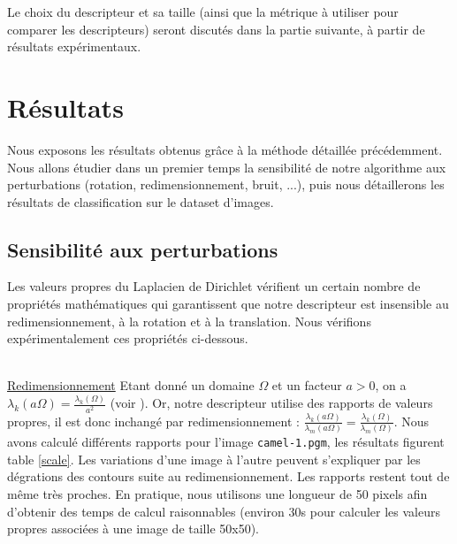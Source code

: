 \documentclass[a4paper,10pt]{article} %
\theoremstyle{definition} %
\begin{document}
Le choix du descripteur et sa taille (ainsi que la métrique à utiliser pour comparer les descripteurs) seront discutés dans la partie suivante, à partir de résultats expérimentaux.


\section{Résultats}

Nous exposons les résultats obtenus grâce à la méthode détaillée précédemment. Nous allons étudier dans un premier temps la sensibilité de notre algorithme aux perturbations (rotation, redimensionnement, bruit, ...), puis nous détaillerons les résultats de classification sur le dataset d'images.


  \subsection{Sensibilité aux perturbations}

Les valeurs propres du Laplacien de Dirichlet vérifient un certain nombre de propriétés mathématiques qui garantissent que notre descripteur est insensible au redimensionnement, à la rotation et à la translation. Nous vérifions expérimentalement ces propriétés ci-dessous.

~\\
\underline{Redimensionnement} Etant donné un domaine $\Omega$ et un facteur $a > 0$, on a $\lambda_k(a \Omega) = \frac{\lambda_k(\Omega)}{a^2}$ (voir \cite{KhabouHR07}). Or, notre descripteur utilise des rapports de valeurs propres, il est donc inchangé par redimensionnement : $\frac{\lambda_k(a \Omega)}{\lambda_m(a \Omega)} = \frac{\lambda_k(\Omega)}{\lambda_m(\Omega)}$. Nous avons calculé différents rapports pour l'image \texttt{camel-1.pgm}, les résultats figurent table \ref{scale}. Les variations d'une image à l'autre peuvent s'expliquer par les dégrations des contours suite au redimensionnement. Les rapports restent tout de même très proches. En pratique, nous utilisons une longueur de 50 pixels afin d'obtenir des temps de calcul raisonnables (environ 30s pour calculer les valeurs propres associées à une image de taille 50x50).
\end{document}
